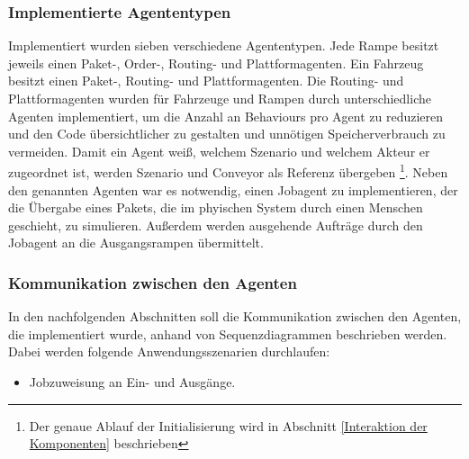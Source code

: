 \subsubsection{Implementierte Agententypen}
Implementiert wurden sieben verschiedene Agententypen. Jede Rampe besitzt jeweils einen Paket-, Order-, Routing- und Plattformagenten. Ein Fahrzeug besitzt einen Paket-, Routing- und Plattformagenten. Die Routing- und Plattformagenten wurden für Fahrzeuge und Rampen durch unterschiedliche Agenten implementiert, um die Anzahl an Behaviours pro Agent zu reduzieren und den Code übersichtlicher zu gestalten und unnötigen Speicherverbrauch zu vermeiden. Damit ein Agent weiß, welchem Szenario und welchem Akteur er zugeordnet ist, werden Szenario und Conveyor als Referenz übergeben \footnote{Der genaue Ablauf der Initialisierung wird in Abschnitt \ref{Interaktion der Komponenten} beschrieben}. Neben den genannten Agenten war es notwendig, einen Jobagent zu implementieren, der die Übergabe eines Pakets, die im phyischen System durch einen Menschen geschieht, zu simulieren. Außerdem werden ausgehende Aufträge durch den Jobagent an die Ausgangsrampen übermittelt.
\subsubsection{Kommunikation zwischen den Agenten}
In den nachfolgenden Abschnitten soll die Kommunikation zwischen den Agenten, die implementiert wurde, anhand von Sequenzdiagrammen beschrieben werden. Dabei werden folgende Anwendungsszenarien durchlaufen:
\begin{itemize}
\item Jobzuweisung an Ein- und Ausgänge.
\end{itemize}

